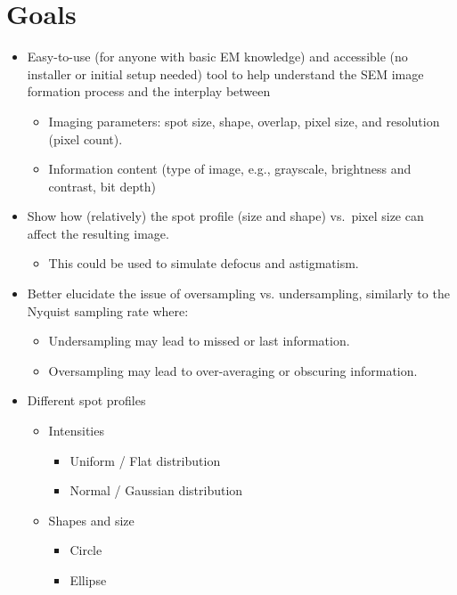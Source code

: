 \documentclass{article}
\begin{document}
\section{Goals}
\begin{itemize}
  \item Easy-to-use (for anyone with basic EM knowledge) and accessible (no
  installer or initial setup needed) tool to help understand the SEM image
  formation process and the interplay between
  \begin{itemize}
  \item Imaging parameters: spot size, shape, overlap, pixel size, and resolution
  (pixel count).
  \item Information content (type of image, e.g., grayscale, brightness and
  contrast, bit depth)
  \end{itemize}
  \item Show how (relatively) the spot profile (size and shape) vs.\ pixel size
  can affect the resulting image.
  \begin{itemize}
    \item This could be used to simulate defocus and astigmatism.
  \end{itemize}
  \item Better elucidate the issue of oversampling vs. undersampling, similarly
  to the Nyquist sampling rate where:
  \begin{itemize}
    \item Undersampling may lead to missed or last information.
    \item Oversampling may lead to over-averaging or obscuring information.
  \end{itemize}
  \item Different spot profiles
  \begin{itemize}
    \item Intensities
    \begin{itemize}
    \item Uniform / Flat distribution
    \item Normal / Gaussian distribution
    \end{itemize}
    \item Shapes and size
    \begin{itemize}
    \item Circle
    \item Ellipse
    \end{itemize}
  \end{itemize}
\end{itemize}
\end{document}

